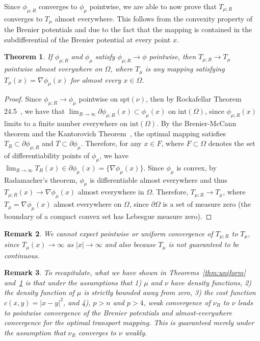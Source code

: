 \documentclass{amsart}
\newtheorem{theorem}{Theorem}
\theoremstyle{lemma}
\newtheorem{remark}[theorem]{Remark}
\theoremstyle{remark}
\begin{document}
Since $\phi_{\mu;R}$ converges to $\phi_{\mu}$ pointwise, we are able to now prove that $T_{\mu;R}$ converges to $T_{\mu}$ almost everywhere. This follows from the convexity property of the Brenier potentials and due to the fact that the mapping is contained in the subdifferential of the Brenier potential at every point $x$.

\begin{theorem}\label{thm:aemapping}
If $\phi_{\mu;R}$ and $\phi_{\mu}$ satisfy $\phi_{\mu;R} \rightarrow \phi$ pointwise, then $T_{\mu;R} \rightarrow T_{\mu}$ pointwise almost everywhere on $\Omega$, where $T_{\mu}$ is any mapping satisfying $T_{\mu}(x) = \nabla \phi_{\mu}(x)$ for almost every $x \in \Omega$.
\end{theorem}
\begin{proof}
Since $\phi_{\mu;R} \rightarrow \phi_{\mu}$ pointwise on $\text{spt}(\nu)$, then by Rockafellar Theorem 24.5~\cite{rockafellar}, we have that $\lim_{R \rightarrow \infty} \partial \phi_{\mu;R}(x) \subset \phi_{\mu}(x)$ on $\text{int}(\Omega)$, since $\phi_{\mu;R}(x)$ limits to a finite number everywhere on $\text{int}(\Omega)$. By the Brenier-McCann theorem and the Kantorovich Theorem~\cite{maggi}, the optimal mapping satisfies $T_{R} \subset \partial \phi_{\mu;R}$ and $T \subset \partial \phi_{\mu}$. Therefore, for any $x \in F$, where $F \subset \Omega$ denotes the set of differentiability points of $\phi_{\mu}$, we have $\lim_{R \rightarrow \infty} T_{R}(x) \in \partial \phi_{\mu}(x) = \{ \nabla \phi_{\mu}(x) \}$. Since $\phi_{\mu}$ is convex, by Radamacher's theorem, $\phi_{\mu}$ is differentiable almost everywhere and thus $T_{\mu;R}(x) \rightarrow \nabla \phi_{\mu}(x)$ almost everywhere in $\Omega$. Therefore, $T_{\mu;R} \rightarrow T_{\mu}$, where $T_{\mu} = \nabla \phi_{\mu}(x)$ almost everywhere on $\Omega$, since $\partial \Omega$ is a set of measure zero (the boundary of a compact convex set has Lebesgue measure zero).
\end{proof}

\begin{remark}
We cannot expect pointwise or uniform convergence of $T_{\mu;R}$ to $T_{\mu}$, since $T_{\mu}(x) \rightarrow \infty$ as $\vert x \vert \rightarrow \infty$ and also because $T_{\mu}$ is not guaranteed to be continuous.
\end{remark}

\begin{remark}
To recapitulate, what we have shown in Theorems~\ref{thm:uniform} and~\ref{thm:aemapping} is that under the assumptions that 1) $\mu$ and $\nu$ have density functions, 2) the density function of $\mu$ is strictly bounded away from zero, 3) the cost function $c(x,y) = \vert x - y \vert^2$, and 4), $p>n$ and $p>4$, weak convergence of $\nu_{R}$ to $\nu$ leads to pointwise convergence of the Brenier potentials and almost-everywhere convergence for the optimal transport mapping. This is guaranteed merely under the assumption that $\nu_{R}$ converges to $\nu$ weakly.
\end{remark}
\end{document}
